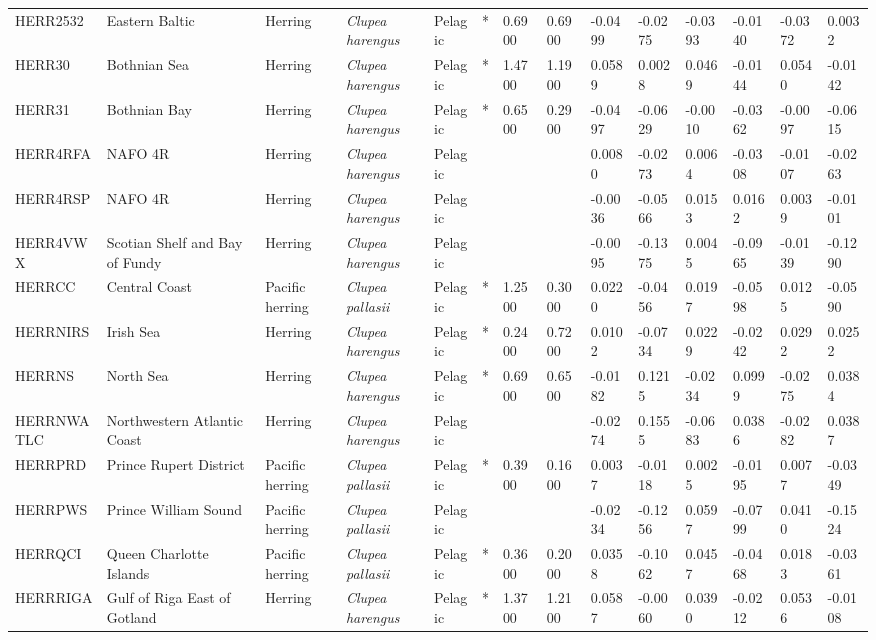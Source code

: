 \begin{longtable}{p{2.8cm}p{2cm}p{1.7cm}p{1.7cm}p{1cm}p{0.3cm}p{1cm}p{1cm}p{1cm}p{1cm}p{1cm}p{1cm}p{1cm}p{1cm}}
  HERR2532 & Eastern Baltic & Herring & \textit{Clupea harengus} & Pelagic & * & 0.6900 & 0.6900 & -0.0499 & -0.0275 & -0.0393 & -0.0140 & -0.0372 & 0.0032 \\ 
  HERR30 & Bothnian Sea & Herring & \textit{Clupea harengus} & Pelagic & * & 1.4700 & 1.1900 & 0.0589 & 0.0028 & 0.0469 & -0.0144 & 0.0540 & -0.0142 \\ 
  HERR31 & Bothnian Bay & Herring & \textit{Clupea harengus} & Pelagic & * & 0.6500 & 0.2900 & -0.0497 & -0.0629 & -0.0010 & -0.0362 & -0.0097 & -0.0615 \\ 
  HERR4RFA & NAFO 4R & Herring & \textit{Clupea harengus} & Pelagic &  &  &  & 0.0080 & -0.0273 & 0.0064 & -0.0308 & -0.0107 & -0.0263 \\ 
  HERR4RSP & NAFO 4R & Herring & \textit{Clupea harengus} & Pelagic &  &  &  & -0.0036 & -0.0566 & 0.0153 & 0.0162 & 0.0039 & -0.0101 \\ 
  HERR4VWX & Scotian Shelf and Bay of Fundy & Herring & \textit{Clupea harengus} & Pelagic &  &  &  & -0.0095 & -0.1375 & 0.0045 & -0.0965 & -0.0139 & -0.1290 \\ 
  HERRCC & Central Coast & Pacific herring & \textit{Clupea pallasii} & Pelagic & * & 1.2500 & 0.3000 & 0.0220 & -0.0456 & 0.0197 & -0.0598 & 0.0125 & -0.0590 \\ 
  HERRNIRS & Irish Sea & Herring & \textit{Clupea harengus} & Pelagic & * & 0.2400 & 0.7200 & 0.0102 & -0.0734 & 0.0229 & -0.0242 & 0.0292 & 0.0252 \\ 
  HERRNS & North Sea & Herring & \textit{Clupea harengus} & Pelagic & * & 0.6900 & 0.6500 & -0.0182 & 0.1215 & -0.0234 & 0.0999 & -0.0275 & 0.0384 \\ 
  HERRNWATLC & Northwestern Atlantic Coast & Herring & \textit{Clupea harengus} & Pelagic &  &  &  & -0.0274 & 0.1555 & -0.0683 & 0.0386 & -0.0282 & 0.0387 \\ 
  HERRPRD & Prince Rupert District & Pacific herring & \textit{Clupea pallasii} & Pelagic & * & 0.3900 & 0.1600 & 0.0037 & -0.0118 & 0.0025 & -0.0195 & 0.0077 & -0.0349 \\ 
  HERRPWS & Prince William Sound & Pacific herring & \textit{Clupea pallasii} & Pelagic &  &  &  & -0.0234 & -0.1256 & 0.0597 & -0.0799 & 0.0410 & -0.1524 \\ 
  HERRQCI & Queen Charlotte Islands & Pacific herring & \textit{Clupea pallasii} & Pelagic & * & 0.3600 & 0.2000 & 0.0358 & -0.1062 & 0.0457 & -0.0468 & 0.0183 & -0.0361 \\ 
  HERRRIGA & Gulf of Riga East of Gotland & Herring & \textit{Clupea harengus} & Pelagic & * & 1.3700 & 1.2100 & 0.0587 & -0.0060 & 0.0390 & -0.0212 & 0.0536 & -0.0108 \\ 

\end{longtable}
